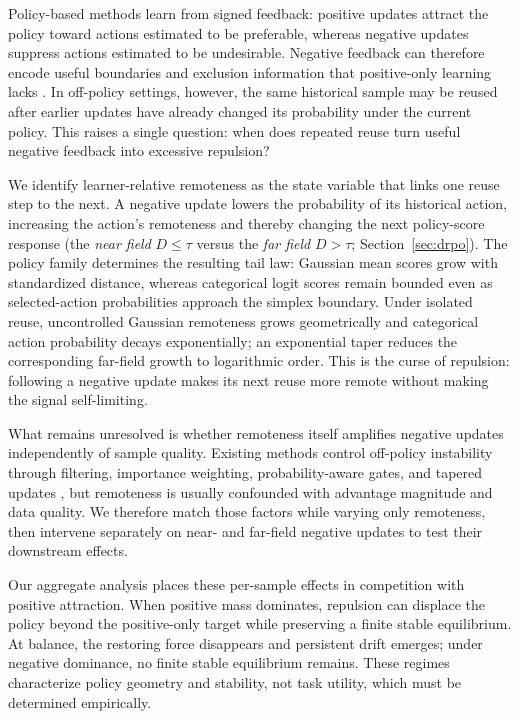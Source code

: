 \documentclass[sigconf,anonymous,review]{acmart}
\theoremstyle{acmdefinition}
\begin{document}
Policy-based methods learn from signed feedback: positive updates attract the
policy toward actions estimated to be preferable, whereas negative updates
suppress actions estimated to be undesirable. Negative feedback can therefore
encode useful boundaries and exclusion information that positive-only learning
lacks \citep{zhu2025negative,song2025good}. In off-policy settings, however,
the same historical sample may be reused after earlier updates have already
changed its probability under the current policy. This raises a single
question: when does repeated reuse turn useful negative feedback into
excessive repulsion?

We identify learner-relative remoteness as the state variable that links one
reuse step to the next. A negative update lowers the probability of its historical action,
increasing the action's remoteness and thereby changing the next
policy-score response (the \emph{near field} \(D\leq\tau\) versus the
\emph{far field} \(D>\tau\); Section~\ref{sec:drpo}). The policy family determines the resulting tail
law: Gaussian mean scores grow with standardized distance, whereas categorical
logit scores remain bounded even as selected-action probabilities approach the
simplex boundary. Under isolated reuse, uncontrolled Gaussian remoteness grows
geometrically and categorical action probability decays exponentially; an
exponential taper reduces the corresponding far-field growth to logarithmic
order. This is the curse of repulsion: following a negative update makes its next
reuse more remote without making the signal self-limiting.

What remains unresolved is whether remoteness itself amplifies negative
updates independently of sample quality. Existing methods control off-policy
instability through filtering, importance weighting, probability-aware gates,
and tapered updates
\citep{novati2019remember,fakoor2020p3o,peng2019advantage,
schulman2017proximal,fujimoto2019off,kumar2020conservative,
arnal2025asymmetric,leroux2025tapered}, but remoteness is usually confounded
with advantage magnitude and data quality. We therefore match those factors
while varying only remoteness, then intervene separately on near- and far-field
negative updates to test their downstream effects.

Our aggregate analysis places these per-sample effects in competition with
positive attraction. When positive mass dominates, repulsion can displace the
policy beyond the positive-only target while preserving a finite stable
equilibrium. At balance, the restoring force disappears and persistent drift
emerges; under negative dominance, no finite stable equilibrium remains.
These regimes characterize policy geometry and stability, not task utility,
which must be determined empirically.
\end{document}

